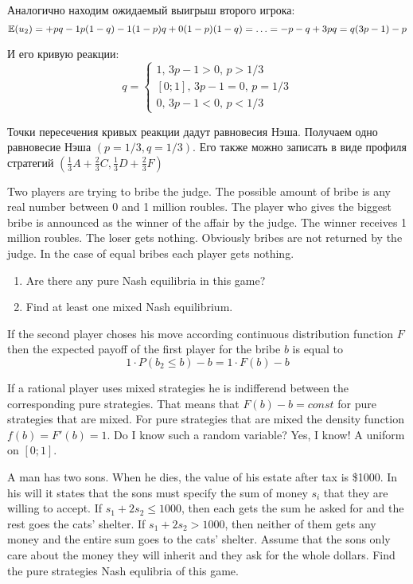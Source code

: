 \begin{solution}
Аналогично находим ожидаемый выигрыш второго игрока:
\[
\mathbb{E}(u_2)=+pq-1p(1-q)-1(1-p)q+0(1-p)(1-q)=\ldots=-p-q+3pq=q(3p-1)-p
\]

И его кривую реакции:
\[
q=
\begin{cases}
1, \, 3p-1>0, \, p>1/3 \\
[0;1], \, 3p-1=0, \, p=1/3 \\
0, \, 3p-1<0, \, p<1/3
\end{cases}
\]

Точки пересечения кривых реакции дадут равновесия Нэша. Получаем одно равновесие Нэша $(p=1/3,q=1/3)$. Его также можно записать в виде профиля стратегий $(\frac{1}{3}A+\frac{2}{3}C,\frac{1}{3}D+\frac{2}{3}F)$


\end{solution}

\begin{problem}
Two players are trying to bribe the judge. The possible amount of bribe is any real number between 0 and 1 million roubles. The player who gives the biggest bribe is announced as the winner of the affair by the judge. The winner receives 1 million roubles. The loser gets nothing. Obviously bribes are not returned by the judge. In the case of equal bribes each player gets nothing.
\begin{enumerate}
\item Are there any pure Nash equilibria in this game?
\item Find at least one mixed Nash equilibrium.
\end{enumerate}
\end{problem}

\begin{solution}
If the second player choses his move according continuous distribution function $F$ then the expected payoff of the first player for the bribe $b$ is equal to
\[
1\cdot P(b_2 \leq b) - b = 1\cdot F(b)-b
\]

If a rational player uses mixed strategies he is indifferend between the corresponding pure strategies. That means that $F(b)-b=const$ for pure strategies that are mixed. For pure strategies that are mixed the density function $f(b)=F'(b)=1$. Do I know such a random variable? Yes, I know! A uniform on $[0;1]$.
\end{solution}

\begin{problem}
A man has two sons. When he dies, the value of his estate after tax is \$1000. In his will it states that the sons must specify the sum of money $s_i$ that they are willing to accept. If $s_1+2s_2\leq 1000$, then each gets the sum he asked for and the rest goes the cats’ shelter. If $s_1+2s_2> 1000$, then neither of them gets any money and the entire sum goes to the cats’ shelter. Assume that the sons only care about the money they will inherit and they ask for the whole dollars. Find the pure strategies Nash equlibria of this game.
\end{problem}


